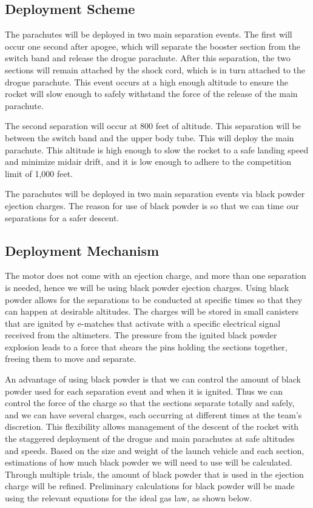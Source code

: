     \subsection{Deployment Scheme}
The parachutes will be deployed in two main separation events. The first will occur one second after apogee, which will separate the booster section from the switch band and release the drogue parachute. After this separation, the two sections will remain attached by the shock cord, which is in turn attached to the drogue parachute. This event occurs at a high enough altitude to ensure the rocket will slow enough to safely withstand the force of the release of the main parachute.

The second separation will occur at 800 feet of altitude. This separation will be between the switch band and the upper body tube. This will deploy the main parachute. This altitude is high enough to slow the rocket to a safe landing speed and minimize midair drift, and it is low enough to adhere to the competition limit of 1,000 feet.
 
The parachutes will be deployed in two main separation events via black powder ejection charges. The reason for use of black powder is so that we can time our separations for a safer descent. 

    \subsection{Deployment Mechanism}
The motor does not come with an ejection charge, and more than one separation is needed, hence we will be using black powder ejection charges. Using black powder allows for the separations to be conducted at specific times so that they can happen at desirable altitudes. The charges will be stored in small canisters that are ignited by e-matches that activate with a specific electrical signal received from the altimeters. The pressure from the ignited black powder explosion leads to a force that shears the pins holding the sections together, freeing them to move and separate. 

An advantage of using black powder is that we can control the amount of black powder used for each separation event and when it is ignited. Thus we can control the force of the charge so that the sections separate totally and safely, and we can have several charges, each occurring at different times at the team’s discretion. This flexibility allows management of the descent of the rocket with the staggered deployment of the drogue and main parachutes at safe altitudes and speeds. Based on the size and weight of the launch vehicle and each section, estimations of how much black powder we will need to use will be calculated. Through multiple trials, the amount of black powder that is used in the ejection charge will be refined. Preliminary calculations for black powder will be made using the relevant equations for the ideal gas law, as shown below.

